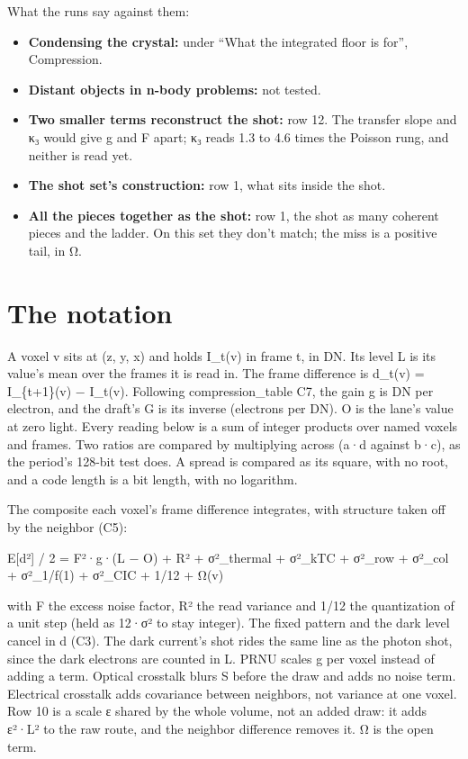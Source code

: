 What the runs say against them:

\begin{itemize}
\item \textbf{Condensing the crystal:} under “What the integrated floor is for”, Compression.
\item \textbf{Distant objects in n-body problems:} not tested.
\item \textbf{Two smaller terms reconstruct the shot:} row 12. The transfer slope and κ₃ would give g and F apart; κ₃ reads 1.3 to 4.6 times the Poisson rung, and neither is read yet.
\item \textbf{The shot set's construction:} row 1, what sits inside the shot.
\item \textbf{All the pieces together as the shot:} row 1, the shot as many coherent pieces and the ladder. On this set they don't match; the miss is a positive tail, in Ω.
\end{itemize}

\section{\texorpdfstring{The notation}{The notation}}

A voxel v sits at (z, y, x) and holds I\_\allowbreak{}t(v) in frame t, in DN. Its level L is its value's mean over the frames it is read in. The frame difference is d\_\allowbreak{}t(v) = I\_\allowbreak{}\{t+1\}(v) − I\_\allowbreak{}t(v). Following compression\_\allowbreak{}table C7, the gain g is DN per electron, and the draft's G is its inverse (electrons per DN). O is the lane's value at zero light. Every reading below is a sum of integer products over named voxels and frames. Two ratios are compared by multiplying across (a·d against b·c), as the period's 128-bit test does. A spread is compared as its square, with no root, and a code length is a bit length, with no logarithm.

The composite each voxel's frame difference integrates, with structure taken off by the neighbor (C5):

E[d²] / 2 = F²·g·(L − O) + R² + σ²\_\allowbreak{}thermal + σ²\_\allowbreak{}kTC + σ²\_\allowbreak{}row + σ²\_\allowbreak{}col + σ²\_\allowbreak{}1/f(1) + σ²\_\allowbreak{}CIC + 1/12 + Ω(v)

with F the excess noise factor, R² the read variance and 1/12 the quantization of a unit step (held as 12·σ² to stay integer). The fixed pattern and the dark level cancel in d (C3). The dark current's shot rides the same line as the photon shot, since the dark electrons are counted in L. PRNU scales g per voxel instead of adding a term. Optical crosstalk blurs S before the draw and adds no noise term. Electrical crosstalk adds covariance between neighbors, not variance at one voxel. Row 10 is a scale ε shared by the whole volume, not an added draw: it adds ε²·L² to the raw route, and the neighbor difference removes it. Ω is the open term.


